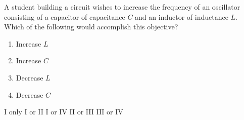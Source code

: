 \documentclass[12pt]{../oss-classkick-exam}
\begin{document}
\begin{questions}
  \question A student building a circuit wishes to increase the frequency of an
  oscillator consisting of a capacitor of capacitance $C$ and an inductor of
  inductance $L$. Which of the following would accomplish this objective?
  \begin{enumerate}[nosep,label={\Roman*.}]
  \item Increase $L$
  \item Increase $C$
  \item Decrease $L$
  \item Decrease $C$
  \end{enumerate}
  
  \vspace{.2in}
  \begin{choices}
    \choice I only
    \choice I or II
    \choice I or IV
    \choice II or III
    \choice III or IV
  \end{choices}
\end{questions}
\end{document}
